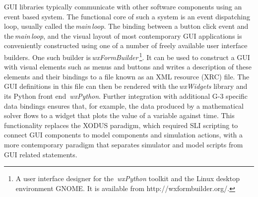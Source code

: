 \documentclass[10pt]{article}
\begin{document}
GUI libraries typically communicate with other software components
using an event based system.  The functional core of such a system is an
event dispatching loop, usually called the\,{\it main\,loop}.
The binding between a button click event and the\,{\it main\,loop}, and
the visual layout of most contemporary GUI applications is
conveniently constructed using one of a number of freely available user
interface builders.
%
%
One such builder is\,{\it wxFormBuilder}\,\footnote{A user interface designer for the\,{\it
    wxPython} toolkit and the Linux desktop environment GNOME. It is
  available from http://wxformbuilder.org/.}. It can be used to construct a GUI with visual elements
such as menus and buttons and writes a description of these elements and
their bindings to a file known as an XML resource (XRC) file.  The GUI
definitions in this file can then be rendered with the\,{\it wxWidgets} library and its Python front end\,{\it
  wxPython}.  Further integration with additional G-3 specific data
bindings ensures that, for example, the data produced by a
mathematical solver flows to a widget that plots the value of a
variable against time.  This functionality replaces the
XODUS paradigm, which required SLI scripting to connect GUI components
to model components and simulation actions, with a more contemporary
paradigm that separates simulator and model scripts from GUI related
statements.
\end{document}
